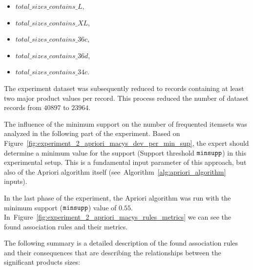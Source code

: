 					\begin{itemize}
						\item $total\_sizes\_contains\_L$,
						\item $total\_sizes\_contains\_XL$,
						\item $total\_sizes\_contains\_36c$,
						\item $total\_sizes\_contains\_36d$,
						\item $total\_sizes\_contains\_34c$.
					\end{itemize}
					
					The experiment dataset was subsequently reduced to records containing at least two major product values per record. This process reduced the number of dataset records from $40897$ to $23964$.
				 
				 The influence of the minimum support on the number of frequented itemsets was analyzed in the following part of the experiment. Based on Figure~\ref{fig:experiment_2_apriori_macys_dev_per_min_sup}, the expert should determine a minimum value for the support (Support threshold ${\operatorname{\mathtt{minsupp}}}$) in this experimental setup. This is a fundamental input parameter of this approach, but also of the Apriori algorithm itself (see~Algorithm~\ref{alg:apriori_algorithm} inputs). 
				 	
				 In the last phase of the experiment, the Apriori algorithm was run with the minimum support (${\operatorname{\mathtt{minsupp}}}$) value of $0.55$. In~Figure~\ref{fig:experiment_2_apriori_macys_rules_metrics} we can see the found association rules and their metrics.
				 	
				 The following summary is a detailed description of the found association rules and their consequences that are describing the relationships between the significant products sizes:
				 

